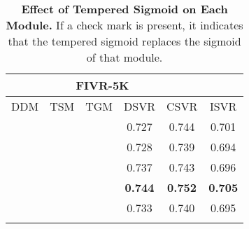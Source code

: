 \documentclass[10pt,twocolumn,letterpaper]{article}
\newcommand{\cmark}{\ding{51}}
\begin{document}
    \begin{table}[t]
        \footnotesize
        \centering
        \begin{tabular}{ccc|ccc}
        \cmidrule[\heavyrulewidth]{1-6}
        \morecmidrules
        \cmidrule[\heavyrulewidth]{1-6}
        \multicolumn{3}{c|}{Tempered Sigmoid} & \multicolumn{3}{c}{FIVR-5K}                      \\ \midrule
        DDM        & TSM        & TGM         & DSVR           & CSVR           & ISVR           \\ \midrule
                   &            &             & 0.727          & 0.744          & 0.701          \\ \midrule
        \cmark     &            &             & 0.728          & 0.739          & 0.694          \\
                   & \cmark     &             & 0.737          & 0.743          & 0.696          \\
        \textbf{}  & \textbf{}  & \textbf{\cmark}  & \textbf{0.744} & \textbf{0.752} & \textbf{0.705} \\ \midrule
        \cmark     & \cmark     & \cmark      & 0.733          & 0.740          & 0.695          \\
        \cmidrule[\heavyrulewidth]{1-6}
        \morecmidrules
        \cmidrule[\heavyrulewidth]{1-6}
        \end{tabular}
        \vspace{4mm}
        \caption{\textbf{Effect of Tempered Sigmoid on Each Module.} If a check mark is present, it indicates that the tempered sigmoid replaces the sigmoid of that module.} \label{tab:tempered}
    \end{table}
    
\end{document}
